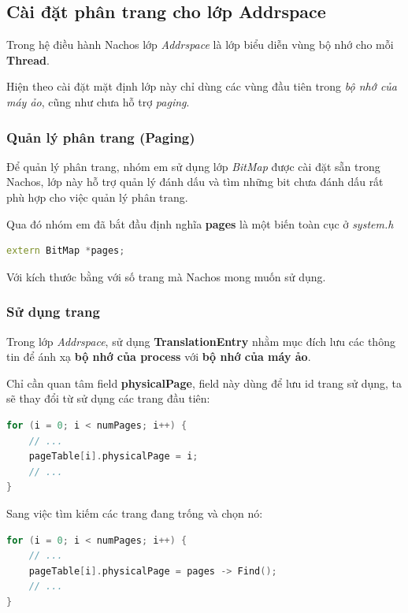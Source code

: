 \subsection{Cài đặt phân trang cho lớp Addrspace}
Trong hệ điều hành Nachos lớp \textit{Addrspace} là lớp biểu diễn vùng bộ nhớ cho mỗi \textbf{Thread}.

Hiện theo cài đặt mặt định lớp này chỉ dùng các vùng đầu tiên trong \textit{bộ nhớ của máy ảo}, cũng như chưa hỗ trợ \textit{paging}.

\subsubsection{Quản lý phân trang (Paging)}

Để quản lý phân trang, nhóm em sử dụng lớp \textit{BitMap} được cài đặt sẵn trong Nachos, lớp này hỗ trợ quản lý đánh dấu và tìm những bit chưa đánh dấu rất phù hợp cho việc quản lý phân trang.

Qua đó nhóm em đã bắt đầu định nghĩa  \textbf{pages} là một biến toàn cục ở \textit{system.h}
\begin{lstlisting}[caption={Định nghĩa BitMap pages}, label={lst:vdcode}, language=C++]
extern BitMap *pages;
\end{lstlisting}

Với kích thước bằng với số trang mà Nachos mong muốn sử dụng.

\subsubsection{Sử dụng trang}
Trong lớp \textit{Addrspace}, sử dụng \textbf{TranslationEntry} nhằm mục đích lưu các thông tin để ánh xạ \textbf{bộ nhớ của process} với \textbf{bộ nhớ của máy ảo}.

Chỉ cần quan tâm field \textbf{physicalPage}, field này dùng để lưu id trang sử dụng, ta sẽ thay đổi từ sử dụng các trang đầu tiên:
\begin{lstlisting}[caption={method physicalPage ban đầu}, label={lst:vdcode}, language=C++]
for (i = 0; i < numPages; i++) {
    // ...
    pageTable[i].physicalPage = i;
    // ...
}
\end{lstlisting}

Sang việc tìm kiếm các trang đang trống và chọn nó:
\begin{lstlisting}[caption={method physicalPage sau chỉnh sửa}, label={lst:vdcode}, language=C++]
for (i = 0; i < numPages; i++) {
    // ...
    pageTable[i].physicalPage = pages -> Find();
    // ...
}
\end{lstlisting}

